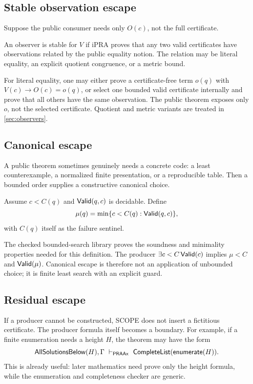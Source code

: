 \subsection{Stable observation escape}

Suppose the public consumer needs only \(O(c)\), not the full certificate.

\begin{definition}
An observer is stable for \(V\) if iPRA proves that any two valid certificates have observations related by the public equality notion.  The relation may be literal equality, an explicit quotient congruence, or a metric bound.
\end{definition}

For literal equality, one may either prove a certificate-free term \(o(q)\) with \(V(c)\to O(c)=o(q)\), or select one bounded valid certificate internally and prove that all others have the same observation.  The public theorem exposes only \(o\), not the selected certificate.  Quotient and metric variants are treated in \cref{sec:observers}.

\subsection{Canonical escape}

A public theorem sometimes genuinely needs a concrete code: a least counterexample, a normalized finite presentation, or a reproducible table.  Then a bounded order supplies a constructive canonical choice.

\begin{definition}
Assume \(c<C(q)\) and \(\mathsf{Valid}(q,c)\) is decidable.  Define
\[
  \mu(q)=\min\{c<C(q):\mathsf{Valid}(q,c)\},
\]
with \(C(q)\) itself as the failure sentinel.
\end{definition}

The checked bounded-search library proves the soundness and minimality properties needed for this definition.  The producer \(\exists c<C\,\mathsf{Valid}(c)\) implies \(\mu<C\) and \(\mathsf{Valid}(\mu)\).  Canonical escape is therefore not an application of unbounded choice; it is finite least search with an explicit guard.

\subsection{Residual escape}

If a producer cannot be constructed, SCOPE does not insert a fictitious certificate.  The producer formula itself becomes a boundary.  For example, if a finite enumeration needs a height \(H\), the theorem may have the form
\[
  \mathsf{AllSolutionsBelow}(H),\Gamma\ \vdash_{\PRAAx}\
  \mathsf{CompleteList}(\mathsf{enumerate}(H)).
\]
This is already useful: later mathematics need prove only the height formula, while the enumeration and completeness checker are generic.

